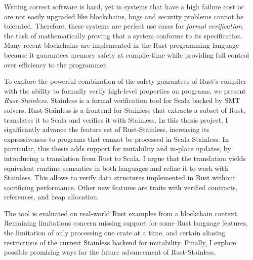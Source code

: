 Writing correct software is hard, yet in systems that have a high failure cost
or are not easily upgraded like blockchains, bugs and security problems cannot
be tolerated. Therefore, these systems are perfect use cases for \emph{formal
verification}, the task of mathematically proving that a system conforms to its
specification. Many recent blockchains are implemented in the Rust programming
language because it guarantees memory safety at compile-time while providing
full control over efficiency to the programmer.

To explore the powerful combination of the safety guarantees of Rust's compiler
with the ability to formally verify high-level properties on programs, we
present \emph{Rust-Stainless}. Stainless is a formal verification tool for Scala
backed by SMT solvers. Rust-Stainless is a frontend for Stainless that extracts
a subset of Rust, translates it to Scala and verifies it with Stainless. In this
thesis project, I significantly advance the feature set of Rust-Stainless,
increasing its expressiveness to programs that cannot be processed in Scala
Stainless. In particular, this thesis adds support for mutability and in-place
updates, by introducing a translation from Rust to Scala. I argue that the
translation yields equivalent runtime semantics in both languages and refine it
to work with Stainless. This allows to verify data structures implemented in
Rust without sacrificing performance. Other new features are traits with
verified contracts, references, and heap allocation.

The tool is evaluated on real-world Rust examples from a blockchain context.
Remaining limitations concern missing support for some Rust language features,
the limitation of only processing one crate at a time, and certain aliasing
restrictions of the current Stainless backend for mutability. Finally, I explore
possible promising ways for the future advancement of Rust-Stainless.
